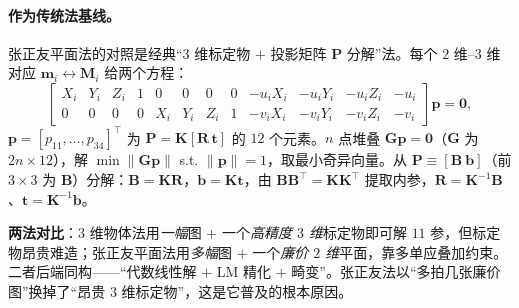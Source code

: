 \paragraph{作为传统法基线。}
张正友平面法的对照是经典“$3$ 维标定物 $+$ 投影矩阵 $\mathbf{P}$ 分解”法\cite{zhang2000calibration}。每个 $2$ 维–$3$ 维对应 $\mathbf{m}_i\leftrightarrow\mathbf{M}_i$ 给两个方程：
\begin{equation}
  \begin{bmatrix} X_i&Y_i&Z_i&1&0&0&0&0&-u_iX_i&-u_iY_i&-u_iZ_i&-u_i\\
                  0&0&0&0&X_i&Y_i&Z_i&1&-v_iX_i&-v_iY_i&-v_iZ_i&-v_i\end{bmatrix}\mathbf{p}=\mathbf{0},
  \label{eq:calib-3d-dlt}
\end{equation}
$\mathbf{p}=[p_{11},\ldots,p_{34}]^\top$ 为 $\mathbf{P}=\mathbf{K}[\mathbf{R}\,\mathbf{t}]$ 的 $12$ 个元素。$n$ 点堆叠 $\mathbf{G}\mathbf{p}=\mathbf{0}$（$\mathbf{G}$ 为 $2n\times12$），解 $\min\|\mathbf{G}\mathbf{p}\|$ s.t. $\|\mathbf{p}\|=1$，取最小奇异向量。从 $\mathbf{P}\equiv[\mathbf{B}\ \mathbf{b}]$（前 $3\times3$ 为 $\mathbf{B}$）分解：$\mathbf{B}=\mathbf{K}\mathbf{R}$，$\mathbf{b}=\mathbf{K}\mathbf{t}$，由 $\mathbf{B}\mathbf{B}^\top=\mathbf{K}\mathbf{K}^\top$ 提取内参，$\mathbf{R}=\mathbf{K}^{-1}\mathbf{B}$、$\mathbf{t}=\mathbf{K}^{-1}\mathbf{b}$。

\begin{insight}
\textbf{两法对比}：$3$ 维物体法用\emph{一幅}图 $+$ 一个\emph{高精度 $3$ 维}标定物即可解 $11$ 参，但标定物昂贵难造；张正友平面法用\emph{多幅}图 $+$ 一个\emph{廉价 $2$ 维}平面，靠多单应叠加约束。二者后端同构——“代数线性解 $+$ LM 精化 $+$ 畸变”。张正友法以“多拍几张廉价图”换掉了“昂贵 $3$ 维标定物”，这是它普及的根本原因。
\end{insight}

